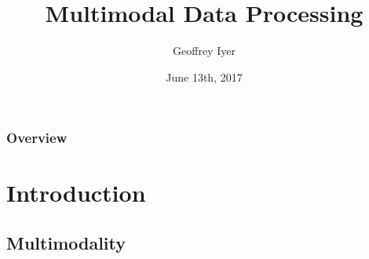 \documentclass{beamer}
\title[Multimodal Data Processing]{Multimodal Data Processing} %
\author{Geoffrey Iyer} %
\institute[UCLA] %
{
  University of California \\ %
  \medskip
  \textit{gsiyer@math.ucla.edu} %
}
\date{June 13th, 2017} %
\begin{document}
\begin{frame}
  \titlepage %
\end{frame}

\begin{frame}
  \frametitle{Overview} %
  \tableofcontents %
\end{frame}


\section{Introduction} %

\subsection{Multimodality} %
\end{document}
